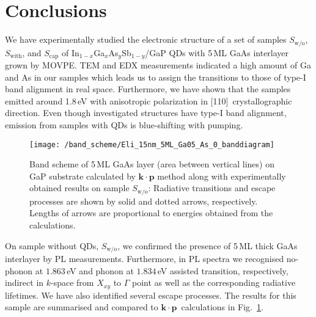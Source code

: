 







\section*{Conclusions} \label{sec:TUB_results}
%
We have experimentally studied the electronic structure of a set of samples $S_\mathrm{w/o}$, $S_\mathrm{with}$, and $S_\mathrm{cap}$ of In$_{1-x}$Ga$_{x}$As$_y$Sb$_{1-y}$/GaP QDs with 5$\,$ML GaAs interlayer grown by MOVPE. TEM and EDX measurements indicated a high amount of Ga and As in our samples which leads us to assign the transitions to those of type-I band alignment in real space. Furthermore, we have shown that the samples emitted around 1.8$\,$eV with anisotropic polarization in [110]~crystallographic direction. Even though investigated structures have type-I band alignment, emission from samples with QDs is blue-shifting with pumping. %

\begin{figure}
	\centering
	\texttt{[image: /band\_scheme/Eli\_15nm\_5ML\_Ga05\_As\_0\_banddiagram]} %
	\caption{Band scheme of 5$\,$ML GaAs layer (area between vertical lines) on GaP substrate calculated by $\mathbf{k \cdot p}$ method along with experimentally obtained results on sample $S_\mathrm{w/o}$: Radiative transitions and escape processes are shown by solid and dotted arrows, respectively. Lengths of arrows are proportional to energies obtained from the calculations.}
	\label{fig:Band_scheme_wo}
\end{figure}
%
On sample without QDs, $S_\mathrm{w/o}$, we confirmed the presence of 5$\,$ML thick GaAs interlayer by PL measurements. Furthermore, in PL spectra we recognised no-phonon at $1.863$$\,$eV and phonon at $1.834$$\,$eV assisted transition, respectively, indirect in $k$-space from $X_{xy}$ to $\Gamma$ point as well as the corresponding radiative lifetimes. We have also identified several escape processes. The results for this sample are summarised and compared to $\mathbf{k \cdot p}$~calculations in Fig.~\ref{fig:Band_scheme_wo}.
%


